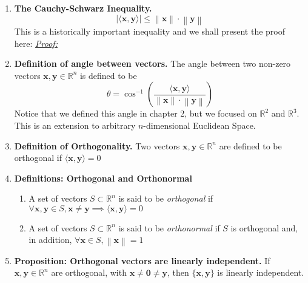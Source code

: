 \documentclass[oneside, 12pt]{book}
\newcommand{\settag}[1]{\renewcommand{\theenumi}{#1}}
\newcommand{\R}{\mathbb{R}}
\newcommand{\tbf}[1]{\textbf{#1}}
\newcommand{\tit}[1]{\textit{#1}}
\newcommand{\proof}{\tit{\underline{Proof:}}} %
\newcommand{\norm}[1]{\left\lVert#1\right\rVert}
\newcommand{\para}[1]{\item \tbf{#1}}
\newcommand{\vx}{\mathbf{x}}
\newcommand{\vy}{\mathbf{y}}
\newcommand{\vzero}{\mathbf{0}}
\begin{document}
\begin{enumerate}
    \settag{4.3.4-(2)}
    \para{The Cauchy-Schwarz Inequality.}
    \begin{equation*}
        \left|\langle \vx, \vy \rangle\right| \leq \norm{\vx} \cdot \norm{\vy}
    \end{equation*}
    This is a historically important inequality and we shall present the proof here: \newline
    \proof
    
    \settag{4.3.5}
    \para{Definition of angle between vectors.} The angle between two non-zero vectors $\vx,\vy \in \R^n$ is defined to be
    \begin{equation*}
        \theta = \cos^{-1}\left(\frac{\langle\vx,\vy\rangle}{\norm{\vx} \cdot \norm{\vy}}\right)
    \end{equation*}
    Notice that we defined this angle in chapter 2, but we focused on $\R^2$ and $\R^3$. This is an extension to arbitrary $n$-dimensional Euclidean Space.
    
    \settag{4.3.7}
    \para{Definition of Orthogonality.} Two vectors $\vx,\vy \in \R^n$ are defined to be orthogonal if $\langle \vx,\vy\rangle = 0$
    
    \settag{4.3.9}
    \para{Definitions: Orthogonal and Orthonormal}
    \begin{enumerate}
        \item A set of vectors $S\subset \R^n$ is said to be \tit{orthogonal} if $\forall \vx,\vy \in S, \vx \neq \vy \implies \langle \vx,\vy\rangle = 0$
        \item A set of vectors $S\subset \R^n$ is said to be \tit{orthonormal} if $S$ is orthogonal and, in addition, $\forall \vx \in S, \norm{\vx} = 1$
    \end{enumerate}
    
    \settag{4.3.10}
    \para{Proposition: Orthogonal vectors are linearly independent.} If $\vx,\vy \in \R^n$ are orthogonal, with $\vx \neq \vzero \neq \vy$, then $\{\vx,\vy\}$ is linearly independent.

\end{enumerate}
\end{document}
